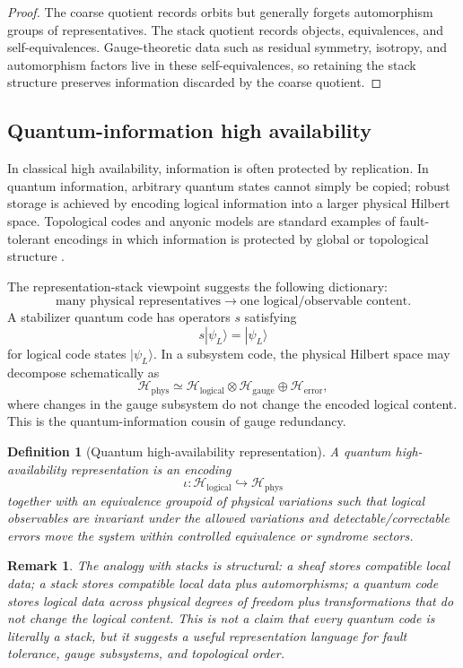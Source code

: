 \documentclass[11pt]{article}
\newtheorem{definition}{Definition}[section]
\newtheorem{remark}{Remark}[section]
\begin{document}
\begin{proof}
The coarse quotient records orbits but generally forgets automorphism groups of representatives. The stack quotient records objects, equivalences, and self-equivalences. Gauge-theoretic data such as residual symmetry, isotropy, and automorphism factors live in these self-equivalences, so retaining the stack structure preserves information discarded by the coarse quotient.
\end{proof}

\subsection{Quantum-information high availability}

In classical high availability, information is often protected by replication. In quantum information, arbitrary quantum states cannot simply be copied; robust storage is achieved by encoding logical information into a larger physical Hilbert space. Topological codes and anyonic models are standard examples of fault-tolerant encodings in which information is protected by global or topological structure \cite{Kitaev1997}.

The representation-stack viewpoint suggests the following dictionary:
\[
\boxed{\text{many physical representatives}\longrightarrow \text{one logical/observable content}.}
\]
A stabilizer quantum code has operators $s$ satisfying
\[
 s|\psi_L\rangle=|\psi_L\rangle
\]
for logical code states $|\psi_L\rangle$. In a subsystem code, the physical Hilbert space may decompose schematically as
\[
\mathcal H_{\mathrm{phys}}\simeq \mathcal H_{\mathrm{logical}}\otimes \mathcal H_{\mathrm{gauge}}\oplus \mathcal H_{\mathrm{error}},
\]
where changes in the gauge subsystem do not change the encoded logical content. This is the quantum-information cousin of gauge redundancy.

\begin{definition}[Quantum high-availability representation]
A \emph{quantum high-availability representation} is an encoding
\[
\iota:\mathcal H_{\mathrm{logical}}\hookrightarrow \mathcal H_{\mathrm{phys}}
\]
together with an equivalence groupoid of physical variations such that logical observables are invariant under the allowed variations and detectable/correctable errors move the system within controlled equivalence or syndrome sectors.
\end{definition}

\begin{remark}
The analogy with stacks is structural: a sheaf stores compatible local data; a stack stores compatible local data plus automorphisms; a quantum code stores logical data across physical degrees of freedom plus transformations that do not change the logical content. This is not a claim that every quantum code is literally a stack, but it suggests a useful representation language for fault tolerance, gauge subsystems, and topological order.
\end{remark}
\end{document}
